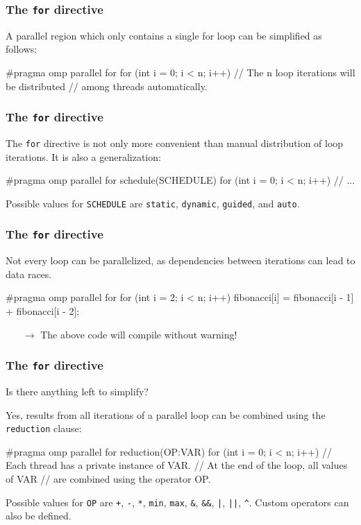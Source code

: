 \documentclass[12pt,t]{beamer}
\let\emph\relax %
\newcommand{\conclude}[1]{%
  \begin{itemize}
    \item[$\rightarrow$]#1
  \end{itemize}
}
\begin{document}
  \begin{frame}[fragile]
    \frametitle{The \texttt{for} directive}

    A parallel region which only contains a single for loop can be simplified as follows:

    \begin{code}
#pragma omp parallel for
for (int i = 0; i < n; i++) {
  // The n loop iterations will be distributed
  // among threads automatically.
}
    \end{code}
  \end{frame}

  \begin{frame}[fragile]
    \frametitle{The \texttt{for} directive}

    The \texttt{for} directive is not only more convenient than manual distribution of loop iterations. It is also a generalization:

    \begin{code}
#pragma omp parallel for schedule(SCHEDULE)
for (int i = 0; i < n; i++) {
  // ...
}
    \end{code}
    Possible values for \texttt{SCHEDULE} are \texttt{static}, \texttt{dynamic}, \texttt{guided}, and \texttt{auto}.
  \end{frame}

  \begin{frame}[fragile]
    \frametitle{The \texttt{for} directive}

    \emph{Caution:} Not every loop can be parallelized, as dependencies between iterations can lead to data races.

    \begin{code}
#pragma omp parallel for
for (int i = 2; i < n; i++) {
  fibonacci[i] = fibonacci[i - 1]
               + fibonacci[i - 2]; 
}
    \end{code}
    \conclude{The above code will compile without warning!}
  \end{frame}

  \begin{frame}[fragile]
    \frametitle{The \texttt{for} directive}

    Is there anything left to simplify?

    Yes, results from all iterations of a parallel loop can be combined using the \texttt{reduction} clause:
    \begin{code}
#pragma omp parallel for reduction(OP:VAR)
for (int i = 0; i < n; i++) {
  // Each thread has a private instance of VAR.
  // At the end of the loop, all values of VAR
  // are combined using the operator OP.
}
    \end{code}
    Possible values for \texttt{OP} are \texttt{+}, \texttt{-}, \texttt{*}, \texttt{min}, \texttt{max}, \texttt{\&}, \texttt{\&\&}, \texttt{|}, \texttt{||}, \texttt{\^}.
    Custom operators can also be defined.
  \end{frame}
\end{document}
